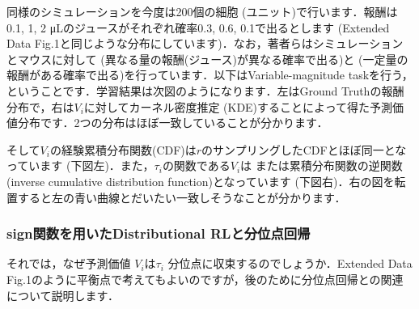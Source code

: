 同様のシミュレーションを今度は200個の細胞 (ユニット)で行います．報酬は0.1, 1, 2 μLのジュースがそれぞれ確率0.3, 0.6, 0.1で出るとします (Extended Data Fig.1と同じような分布にしています)．なお，著者らはシミュレーションとマウスに対して\textbf{}
(異なる量の報酬(ジュース)が異なる確率で出る)と\textbf{} (一定量の報酬がある確率で出る)を行っています．以下はVariable-magnitude taskを行う，ということです．学習結果は次図のようになります．左はGround Truthの報酬分布で，右は$V_i$に対してカーネル密度推定
(KDE)することによって得た予測価値分布です．2つの分布はほぼ一致していることが分かります．





そして$V_i$の経験累積分布関数(CDF)は$r$のサンプリングしたCDFとほぼ同一となっています (下図左)．また，$\tau_i$の関数である$V_i$は\textbf{} または累積分布関数の逆関数 (inverse cumulative distribution function)となっています
(下図右)．右の図を転置すると左の青い曲線とだいたい一致しそうなことが分かります．

\subsubsection{sign関数を用いたDistributional RLと分位点回帰}

それでは，なぜ予測価値 $V_i$は$\tau_i$ 分位点に収束するのでしょうか．Extended Data Fig.1のように平衡点で考えてもよいのですが，後のために分位点回帰との関連について説明します．

